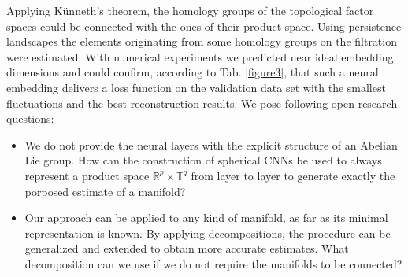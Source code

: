 \documentclass[runningheads,orivec]{llncs}
\begin{document}
Applying Künneth's theorem, the homology groups of the topological factor spaces could be connected with the ones of their product space. Using persistence landscapes the elements originating from some homology groups on the filtration were estimated. With numerical experiments we predicted near ideal embedding dimensions and could confirm, according to Tab. \ref{figure3}, that such a neural embedding delivers a loss function on the validation data set with the smallest fluctuations and the best reconstruction results. We pose following open research questions:
\begin{itemize}
    \item We do not provide the neural layers with the explicit structure of an Abelian Lie group. How can the construction of spherical CNNs \cite{CohenGKW18} be used to always represent a product space $\mathbb{R}^p \times \mathbb{T}^q$ from layer to layer to generate exactly the porposed estimate of a manifold?
    \item Our approach can be applied to any kind of manifold, as far as its minimal representation is known. By applying decompositions, the procedure can be generalized and extended to obtain more accurate estimates. What decomposition can we use if we do not require the manifolds to be connected?
\end{itemize}



\end{document}
